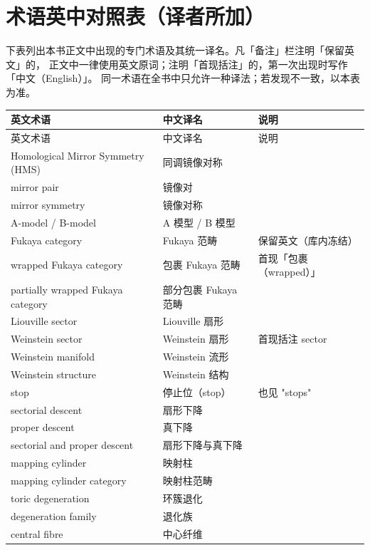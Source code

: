 \section{术语英中对照表（译者所加）}
下表列出本书正文中出现的专门术语及其统一译名。凡「备注」栏注明「保留英文」的，
正文中一律使用英文原词；注明「首现括注」的，第一次出现时写作「中文（English）」。
同一术语在全书中只允许一种译法；若发现不一致，以本表为准。

{\small
\begin{longtable}{p{5.0cm}p{5.6cm}p{3.6cm}}
\toprule
英文术语 & 中文译名 & 说明 \\
\midrule
\endfirsthead
\toprule
英文术语 & 中文译名 & 说明 \\
\midrule
\endhead
\bottomrule
\endfoot
Homological Mirror Symmetry (HMS) & 同调镜像对称 &  \\
mirror pair & 镜像对 &  \\
mirror symmetry & 镜像对称 &  \\
A-model / B-model & A 模型 / B 模型 &  \\
Fukaya category & Fukaya 范畴 & 保留英文（库内冻结） \\
wrapped Fukaya category & 包裹 Fukaya 范畴 & 首现「包裹（wrapped）」 \\
partially wrapped Fukaya category & 部分包裹 Fukaya 范畴 &  \\
Liouville sector & Liouville 扇形 &  \\
Weinstein sector & Weinstein 扇形 & 首现括注 sector \\
Weinstein manifold & Weinstein 流形 &  \\
Weinstein structure & Weinstein 结构 &  \\
stop & 停止位（stop） & 也见 "stops" \\
sectorial descent & 扇形下降 &  \\
proper descent & 真下降 &  \\
sectorial and proper descent & 扇形下降与真下降 &  \\
mapping cylinder & 映射柱 &  \\
mapping cylinder category & 映射柱范畴 &  \\
toric degeneration & 环簇退化 &  \\
degeneration family & 退化族 &  \\
central fibre & 中心纤维 &  \\

\end{longtable}}
